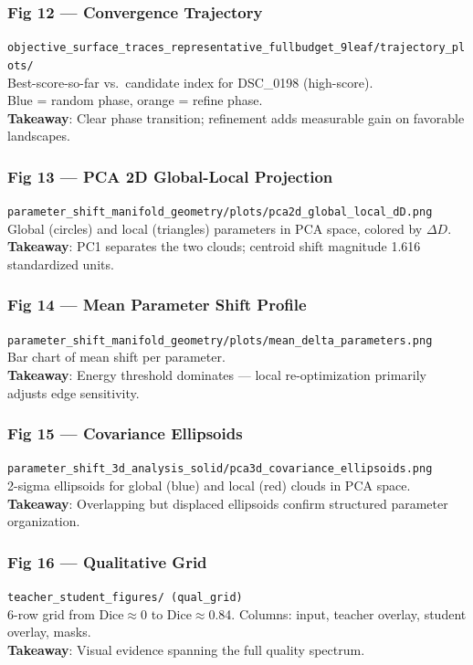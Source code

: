 \documentclass[11pt,a4paper]{article}
\newcommand{\filepath}[1]{\texttt{\small #1}}
\begin{document}
\subsubsection{Fig 12 --- Convergence Trajectory}
\filepath{objective\_surface\_traces\_representative\_fullbudget\_9leaf/trajectory\_plots/}\\
Best-score-so-far vs.\ candidate index for DSC\_0198 (high-score).\\
Blue = random phase, orange = refine phase.\\
\textbf{Takeaway}: Clear phase transition; refinement adds measurable gain on favorable landscapes.

\subsubsection{Fig 13 --- PCA 2D Global-Local Projection}
\filepath{parameter\_shift\_manifold\_geometry/plots/pca2d\_global\_local\_dD.png}\\
Global (circles) and local (triangles) parameters in PCA space, colored by $\Delta D$.\\
\textbf{Takeaway}: PC1 separates the two clouds; centroid shift magnitude 1.616 standardized units.

\subsubsection{Fig 14 --- Mean Parameter Shift Profile}
\filepath{parameter\_shift\_manifold\_geometry/plots/mean\_delta\_parameters.png}\\
Bar chart of mean shift per parameter.\\
\textbf{Takeaway}: Energy threshold dominates --- local re-optimization primarily adjusts edge sensitivity.

\subsubsection{Fig 15 --- Covariance Ellipsoids}
\filepath{parameter\_shift\_3d\_analysis\_solid/pca3d\_covariance\_ellipsoids.png}\\
2-sigma ellipsoids for global (blue) and local (red) clouds in PCA space.\\
\textbf{Takeaway}: Overlapping but displaced ellipsoids confirm structured parameter organization.

\subsubsection{Fig 16 --- Qualitative Grid}
\filepath{teacher\_student\_figures/ (qual\_grid)}\\
6-row grid from Dice$\approx$0 to Dice$\approx$0.84.  Columns: input, teacher overlay, student overlay, masks.\\
\textbf{Takeaway}: Visual evidence spanning the full quality spectrum.
\end{document}
